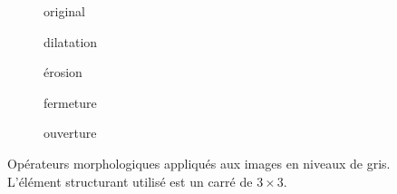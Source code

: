  \begin{figure}
  \begin{subfigure}[t]{0.30\textwidth}
    \centering
    \caption{original}
  \end{subfigure}
  \begin{subfigure}[t]{0.30\textwidth}
    \centering
    \caption{dilatation}
  \end{subfigure}
  \begin{subfigure}[t]{0.30\textwidth}
    \centering
    \caption{érosion}
  \end{subfigure}
  \centering
  \begin{subfigure}[t]{0.30\textwidth}
    \centering
    \caption{fermeture}
  \end{subfigure}
  \begin{subfigure}[t]{0.30\textwidth}
    \centering
    \caption{ouverture}
  \end{subfigure}  
  \caption{Opérateurs morphologiques appliqués aux images en niveaux de gris. L'élément structurant utilisé est un carré de $3\times3$.}
  \label{fig:greyscale_morpho}
\end{figure}

